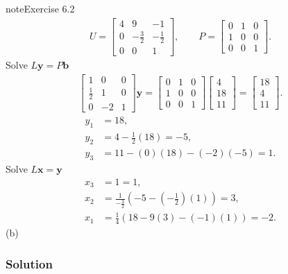 \documentclass[letterpaper,10pt,english]{jupyterBook}
\begin{document}
\begin{sphinxadmonition}{note}{Exercise 6.2}
\begin{align*}
    U = \left[\begin{matrix}4 & 9 & -1\\0 & - \frac{3}{2} & - \frac{1}{2}\\0 & 0 & 1\end{matrix}\right], \qquad
    P = \left[\begin{matrix}0 & 1 & 0\\1 & 0 & 0\\0 & 0 & 1\end{matrix}\right].
\end{align*}
\sphinxAtStartPar
Solve \(L \mathbf{y} = P \mathbf{b}\)
\begin{align*} \left[\begin{matrix}1 & 0 & 0\\\frac{1}{2} & 1 & 0\\0 & -2 & 1\end{matrix}\right] \mathbf{y} = \left[\begin{matrix}0 & 1 & 0\\1 & 0 & 0\\0 & 0 & 1\end{matrix}\right] \left[\begin{matrix}4\\18\\11\end{matrix}\right] = \left[\begin{matrix}18\\4\\11\end{matrix}\right]. \end{align*}\begin{align*}
    y_{1} &= 18, \\
    y_{2} &= 4 - \frac{1}{2}\left(18\right) = -5, \\
    y_{3} &= 11 - \left(0\right)\left(18\right) - \left(-2\right)\left(-5\right) = 1.
\end{align*}
\sphinxAtStartPar
Solve \(L \mathbf{x} = \mathbf{y}\)
\begin{align*}
    x_{3} &= 1 = 1, \\
    x_{2} &= \frac{1}{- \frac{3}{2}}\left(-5 - \left(- \frac{1}{2}\right)\left(1\right)\right) = 3, \\
    x_{1} &= \frac{1}{4}\left(18 - 9\left(3\right) - \left(-1\right)\left(1\right)\right) = -2.
\end{align*}
\sphinxAtStartPar
(b)
\subsubsection*{Solution}


\end{sphinxadmonition}
\end{document}
